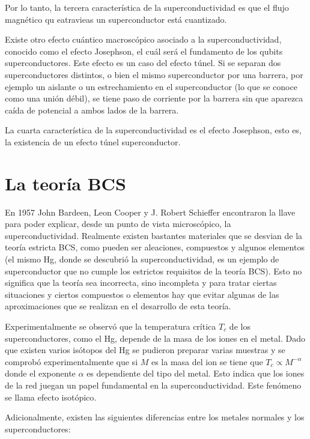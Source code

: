 Por lo tanto, la tercera característica de la superconductividad es que el flujo magnético qu eatravieas un superconductor está cuantizado.

Existe otro efecto cuántico macroscópico asociado a la superconductividad, conocido como el efecto Josephson, el cuál será el fundamento de los qubits superconductores. Este efecto es un caso del efecto túnel. Si se separan dos superconductores distintos, o bien el mismo superconductor por una barrera, por ejemplo un aislante o un estrechamiento en el superconductor (lo que se conoce como una unión débil), se tiene paso de corriente por la barrera sin que aparezca caída de potencial a ambos lados de la barrera.

La cuarta característica de la superconductividad es el efecto Josephson, esto es, la existencia de un efecto túnel superconductor.


\section{La teoría BCS}

En 1957 John Bardeen, Leon Cooper y J. Robert Schieffer \cite{bcs} encontraron la llave para poder explicar, desde un punto de vista microscópico, la superconductividad. Realmente existen bastantes materiales que se desvian de la teoría estricta BCS, como pueden ser aleaciones, compuestos y algunos elementos (el mismo Hg, donde se descubrió la superconductividad, es un ejemplo de superconductor que no cumple los estrictos requisitos de la teoría BCS). Esto no significa que la teoría sea incorrecta, sino incompleta y para tratar ciertas situaciones y ciertos compuestos o elementos hay que evitar algunas de las aproximaciones que se realizan en el desarrollo de esta teoría.

Experimentalmente se observó que la temperatura crítica $T_c$ de los superconductores, como el Hg, depende de la masa de los iones en el metal. Dado que existen varios isótopos del Hg se pudieron preparar varias muestras y se comprobó experimentalmente que si $M$ es la masa del ion se tiene que $T_c \propto M^{-\alpha}$ donde el exponente $\alpha$ es dependiente del tipo del metal. Esto indica que los iones de la red juegan un papel fundamental en la superconductividad. Este fenómeno se llama efecto isotópico.

Adicionalmente, existen las siguientes diferencias entre los metales normales y los superconductores:

